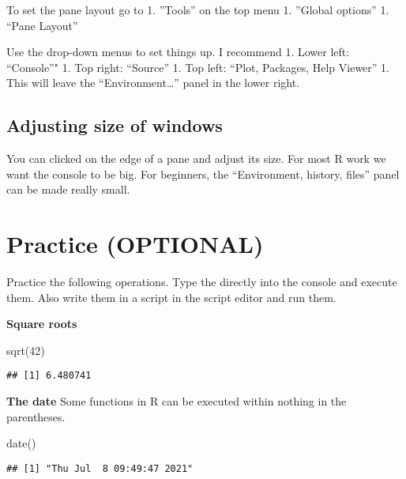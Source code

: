 \documentclass[
]{book}
\newenvironment{Shaded}{\begin{snugshade}}{\end{snugshade}}
\newcommand{\DecValTok}[1]{\textcolor[rgb]{0.00,0.00,0.81}{#1}}
\newcommand{\FunctionTok}[1]{\textcolor[rgb]{0.00,0.00,0.00}{#1}}
\newcommand{\NormalTok}[1]{#1}
\begin{document}
To set the pane layout go to
1. ''Tools'' on the top menu
1. ''Global options''
1. ``Pane Layout''

Use the drop-down menus to set things up. I recommend
1. Lower left: ``Console''"
1. Top right: ``Source''
1. Top left: ``Plot, Packages, Help Viewer''
1. This will leave the ``Environment\ldots{}'' panel in the lower right.

\hypertarget{adjusting-size-of-windows}{%
\subsection{Adjusting size of windows}\label{adjusting-size-of-windows}}

You can clicked on the edge of a pane and adjust its size. For most R work we want the console to be big. For beginners, the ``Environment, history, files'' panel can be made really small.

\hypertarget{practice-optional}{%
\section{Practice (OPTIONAL)}\label{practice-optional}}

Practice the following operations. Type the directly into the console and execute them. Also write them in a script in the script editor and run them.

\textbf{Square roots}

\begin{Shaded}
\begin{Highlighting}[]
\FunctionTok{sqrt}\NormalTok{(}\DecValTok{42}\NormalTok{)}
\end{Highlighting}
\end{Shaded}

\begin{verbatim}
## [1] 6.480741
\end{verbatim}

\textbf{The date}
Some functions in R can be executed within nothing in the parentheses.

\begin{Shaded}
\begin{Highlighting}[]
\FunctionTok{date}\NormalTok{()}
\end{Highlighting}
\end{Shaded}

\begin{verbatim}
## [1] "Thu Jul  8 09:49:47 2021"
\end{verbatim}
\end{document}

